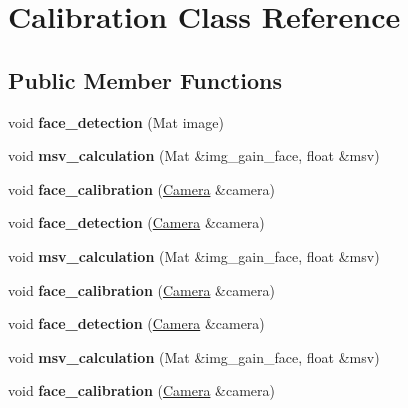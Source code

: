 \hypertarget{classCalibration}{\section{Calibration Class Reference}
\label{classCalibration}
}
\subsection*{Public Member Functions}
\begin{DoxyCompactItemize}
\item 
\hypertarget{classCalibration_ae7414c6392c711b2edb4cb3eced56e2e}{void {\bfseries face\-\_\-detection} (Mat image)}\label{classCalibration_ae7414c6392c711b2edb4cb3eced56e2e}

\item 
\hypertarget{classCalibration_a37a607dcff2f6ea28a336dbf1dc213be}{void {\bfseries msv\-\_\-calculation} (Mat \&img\-\_\-gain\-\_\-face, float \&msv)}\label{classCalibration_a37a607dcff2f6ea28a336dbf1dc213be}

\item 
\hypertarget{classCalibration_ac392274c6e2da6bee113647eb6ec57ce}{void {\bfseries face\-\_\-calibration} (\hyperlink{classCamera}{Camera} \&camera)}\label{classCalibration_ac392274c6e2da6bee113647eb6ec57ce}

\item 
\hypertarget{classCalibration_a7d41e4cf5e7440c6fa0abd0bb5ead3fc}{void {\bfseries face\-\_\-detection} (\hyperlink{classCamera}{Camera} \&camera)}\label{classCalibration_a7d41e4cf5e7440c6fa0abd0bb5ead3fc}

\item 
\hypertarget{classCalibration_a37a607dcff2f6ea28a336dbf1dc213be}{void {\bfseries msv\-\_\-calculation} (Mat \&img\-\_\-gain\-\_\-face, float \&msv)}\label{classCalibration_a37a607dcff2f6ea28a336dbf1dc213be}

\item 
\hypertarget{classCalibration_ac392274c6e2da6bee113647eb6ec57ce}{void {\bfseries face\-\_\-calibration} (\hyperlink{classCamera}{Camera} \&camera)}\label{classCalibration_ac392274c6e2da6bee113647eb6ec57ce}

\item 
\hypertarget{classCalibration_a7d41e4cf5e7440c6fa0abd0bb5ead3fc}{void {\bfseries face\-\_\-detection} (\hyperlink{classCamera}{Camera} \&camera)}\label{classCalibration_a7d41e4cf5e7440c6fa0abd0bb5ead3fc}

\item 
\hypertarget{classCalibration_a37a607dcff2f6ea28a336dbf1dc213be}{void {\bfseries msv\-\_\-calculation} (Mat \&img\-\_\-gain\-\_\-face, float \&msv)}\label{classCalibration_a37a607dcff2f6ea28a336dbf1dc213be}

\item 
\hypertarget{classCalibration_ac392274c6e2da6bee113647eb6ec57ce}{void {\bfseries face\-\_\-calibration} (\hyperlink{classCamera}{Camera} \&camera)}\label{classCalibration_ac392274c6e2da6bee113647eb6ec57ce}

\end{DoxyCompactItemize}
